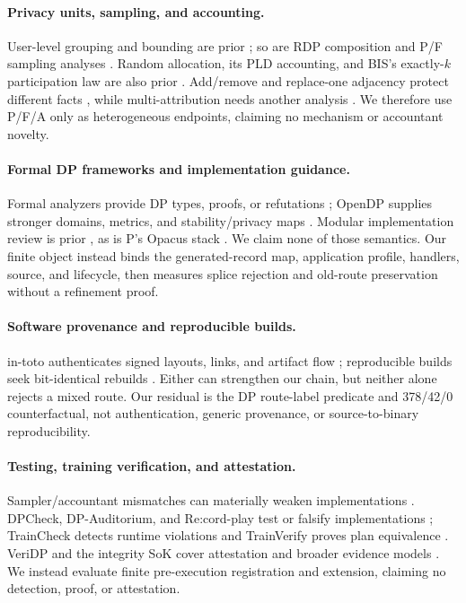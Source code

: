\documentclass[letterpaper]{article}
\begin{document}
\paragraph{Privacy units, sampling, and accounting.}
User-level grouping and bounding are prior \citep{chua2024mind}; so are RDP
composition and P/F sampling analyses
\citep{mironov2017renyi,wang2019subsampled,birrell2024fixed}.  Random allocation,
its PLD accounting, and BIS's exactly-$k$ participation law are also prior
\citep{shenfeld2025randomallocation,feldman2026efficientallocation,
dong2026lessrandom}.  Add/remove and replace-one adjacency protect different
facts \citep{pradhan2026beyond}, while multi-attribution needs another analysis
\citep{ganesh2025multiattribution}.  We therefore use P/F/A only as
heterogeneous endpoints, claiming no mechanism or accountant novelty.

\paragraph{Formal DP frameworks and implementation guidance.}
Formal analyzers provide DP types, proofs, or refutations
\citep{zhang2017lightdp,wang2020checkdp,near2019duetfull,
haselwarter2026modularfull}; OpenDP supplies stronger domains, metrics, and
stability/privacy maps \citep{hay2020opendp}.  Modular implementation review is
prior \citep{kifer2020guidelines}, as is P's Opacus stack
\citep{yousefpour2021opacus}.  We claim none of those semantics.  Our finite
object instead binds the generated-record map, application profile, handlers,
source, and lifecycle, then measures splice rejection and old-route
preservation without a refinement proof.

\paragraph{Software provenance and reproducible builds.}
in-toto authenticates signed layouts, links, and artifact flow
\citep{torresarias2019intoto}; reproducible builds seek bit-identical rebuilds
\citep{lamb2022reproducible}.  Either can strengthen our chain, but neither alone
rejects a mixed route.  Our residual is the DP route-label predicate and
378/42/0 counterfactual, not authentication, generic provenance, or
source-to-binary reproducibility.

\paragraph{Testing, training verification, and attestation.}
Sampler/accountant mismatches can materially weaken implementations
\citep{chua2024private}.  DPCheck, DP-Auditorium, and Re:cord-play test or
falsify implementations
\citep{zhang2020dpcheck,kong2024dpauditorium,cebere2026recordplay}; TrainCheck
detects runtime violations and TrainVerify proves plan equivalence
\citep{jiang2025training,lu2025trainverify}.  VeriDP and the integrity SoK cover
attestation and broader evidence models
\citep{abdolmaleki2026veridp,rizzini2026integrity}.  We instead evaluate finite
pre-execution registration and extension, claiming no detection, proof, or
attestation.
\end{document}

